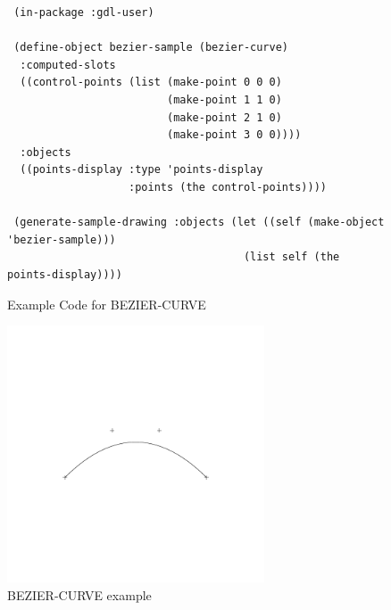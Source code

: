 \documentclass [11pt]{book}
\begin{document}
\begin{itemize}
\begin{description}
\end{description}




\begin{figure}
\begin{lrbox}{\boxedverb}
\begin{minipage}{\linewidth}
{\small

\begin{verbatim}
 (in-package :gdl-user)

 (define-object bezier-sample (bezier-curve)
  :computed-slots
  ((control-points (list (make-point 0 0 0)
                         (make-point 1 1 0)
                         (make-point 2 1 0)
                         (make-point 3 0 0))))
  :objects
  ((points-display :type 'points-display
                   :points (the control-points))))

 (generate-sample-drawing :objects (let ((self (make-object 'bezier-sample)))
                                     (list self (the points-display))))

\end{verbatim}}
\end{minipage}
\end{lrbox}
\fbox{\usebox{\boxedverb}}

\caption{Example Code for BEZIER-CURVE}

\label{fig:example-code-BEZIER-CURVE}

\end{figure}

\begin{figure}
\begin{center}
\includegraphics[width=3in,height=3in]{../images/example-BEZIER-CURVE.pdf}
\end{center}

\caption{BEZIER-CURVE example}


\end{figure}
\end{itemize}
\end{document}
